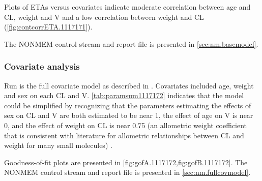 Plots of \glspl{ETA} versus covariates %
 indicate moderate correlation between age and \gls{CL}, weight and \gls{V} and a low correlation between weight and \gls{CL} (\cref{fig:contcorrETA.1117171}).

The NONMEM control stream and report file is presented in \cref{sec:nm.basemodel}. 





\clearpage 

\subsubsection{Covariate analysis}

Run  is the full covariate model as described in \autocite[p.~536]{Bauer2019}. Covariates included age, weight and sex on each \gls{CL} and \gls{V}. \cref{tab:paramsum1117172} indicates that the model could be simplified by recognizing that the parameters estimating the effects of sex on \gls{CL} and \gls{V} are both estimated to be near 1, the effect of age on \gls{V} is near 0, and the effect of weight on \gls{CL} is near 0.75 (an allometric weight coefficient that is consistent with literature for allometric relationships between \gls{CL} and weight for many small molecules) \autocite{Bauer2019}. %

Goodness-of-fit plots are presented in \cref{fig:gofA.1117172,fig:gofB.1117172}. The NONMEM control stream and report file is presented in \cref{sec:nm.fullcovmodel}. 





